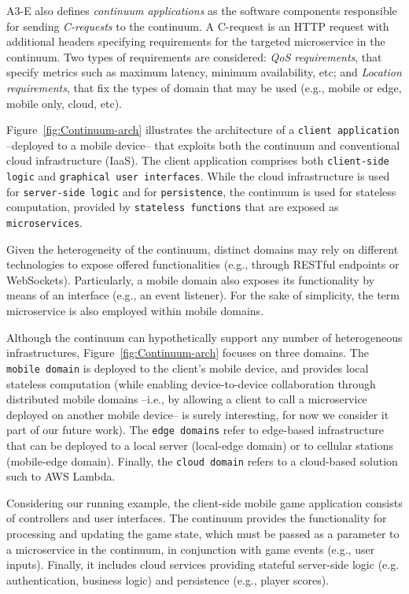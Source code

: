 A3-E also defines \textit{continuum applications} as the software components responsible for sending \textit{C-requests} to the continuum. A C-request is an HTTP request with additional headers specifying requirements for the targeted microservice in the continuum. Two types of requirements are considered: \textit{QoS requirements}, that specify metrics such as maximum latency, minimum availability, etc; and \textit{Location requirements}, that fix the types of domain that may be used (e.g., mobile or edge, mobile only, cloud, etc). 

Figure~\ref{fig:Continuum-arch} illustrates the architecture of a \texttt{client application} --deployed to a mobile device-- that exploits both the continuum and conventional cloud infrastructure (IaaS). The client application comprises both \texttt{client-side logic} and \texttt{graphical user interfaces}. While the cloud infrastructure is used for \texttt{server-side logic} and for \texttt{persistence}, the continuum is used for stateless computation, provided by \texttt{stateless functions} that are exposed as \texttt{microservices}.

Given the heterogeneity of the continuum, distinct domains may rely on different technologies to expose offered functionalities (e.g., through RESTful endpoints or WebSockets). Particularly, a mobile domain also exposes its functionality by means of an interface (e.g., an event listener). For the sake of simplicity, the term microservice is also employed within mobile domains.

Although the continuum can hypothetically support any number of heterogeneous infrastructures, Figure~\ref{fig:Continuum-arch} focuses on three domains. The \texttt{mobile domain} is deployed to the client's mobile device, and provides local stateless computation (while enabling device-to-device collaboration through distributed mobile domains --i.e., by allowing a client to call a microservice deployed on another mobile device-- is surely interesting, for now we consider it part of our future work). The \texttt{edge domains} refer to edge-based infrastructure that can be deployed to a local server (local-edge domain) or to cellular stations (mobile-edge domain). Finally, the \texttt{cloud domain} refers to a cloud-based solution such to AWS Lambda.

Considering our running example, the client-side mobile game application consists of controllers and user interfaces. The continuum provides the functionality for processing and updating the game state, which must be passed as a parameter to a microservice in the continuum, in conjunction with game events (e.g., user inputs). Finally, it includes cloud services providing stateful server-side logic (e.g. authentication, business logic) and persistence (e.g., player scores). 

